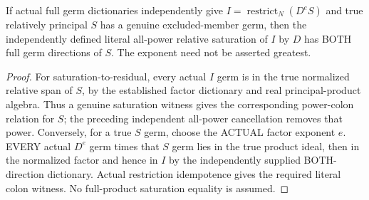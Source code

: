 \begin{theorem}
\label{hir:sharp-actual-relative-factor-all-power-saturation-dictionary}
\leanok
If actual full germ dictionaries independently give
$I=\operatorname{restrict}_N(D^e S)$ and true relatively principal $S$
has a genuine excluded-member germ, then the independently defined literal
all-power relative saturation of $I$ by $D$ has BOTH full germ directions of
$S$. The exponent need not be asserted greatest.
\end{theorem}
\begin{proof}
For saturation-to-residual, every actual $I$ germ is in the true normalized
relative span of $S$, by the established factor dictionary and real
principal-product algebra. Thus a genuine saturation witness gives the
corresponding power-colon relation for $S$; the preceding independent
all-power cancellation removes that power. Conversely, for a true $S$ germ,
choose the ACTUAL factor exponent $e$. EVERY actual $D^e$ germ times that
$S$ germ lies in the true product ideal, then in the normalized factor and
hence in $I$ by the independently supplied BOTH-direction dictionary.
Actual restriction idempotence gives the required literal colon witness.
No full-product saturation equality is assumed.
\end{proof}


